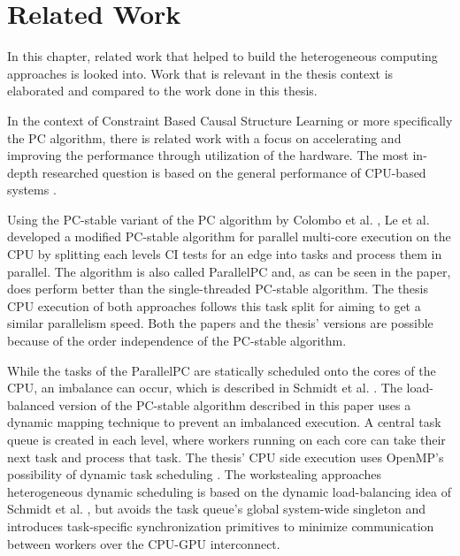 \chapter{Related Work}
\label{chap:relwork}
In this chapter, related work that helped to build the heterogeneous computing approaches is looked into. Work that is relevant in the thesis context is elaborated and compared to the work done in this thesis.

In the context of Constraint Based Causal Structure Learning or more specifically the PC algorithm, there is related work with a focus on accelerating and improving the performance through utilization of the hardware. The most in-depth researched question is based on the general performance of CPU-based systems \cite{leFastPCAlgorithm2019, leParallelPCPackageEfficient2018, schmidtLoadBalancedParallelConstraintBased2019, colomboOrderIndependentConstraintBasedCausal,kalischEstimatingHighDimensionalDirected2007,scutariBayesianNetworkConstraintBased2017, madsenParallelAlgorithmBayesian2017,madsenParallelisationPCAlgorithm2015,nguyenMrPCCausalStructure2020}. 

Using the PC-stable variant of the PC algorithm by Colombo et al. \cite{colomboOrderIndependentConstraintBasedCausal}, Le et al. \cite{leFastPCAlgorithm2019, leParallelPCPackageEfficient2018} developed a modified PC-stable algorithm for parallel multi-core execution on the CPU by splitting each levels CI tests for an edge into tasks and process them in parallel. The algorithm is also called ParallelPC and, as can be seen in the paper, does perform better than the single-threaded PC-stable algorithm. The thesis CPU execution of both approaches follows this task split for aiming to get a similar parallelism speed. Both the papers and the thesis' versions are possible because of the order independence of the PC-stable algorithm.

While the tasks of the ParallelPC are statically scheduled onto the cores of the CPU, an imbalance can occur, which is described in Schmidt et al. \cite{schmidtLoadBalancedParallelConstraintBased2019}. The load-balanced version of the PC-stable algorithm described in this paper uses a dynamic mapping technique to prevent an imbalanced execution. A central task queue is created in each level, where workers running on each core can take their next task and process that task. The thesis' CPU side execution uses OpenMP's possibility of dynamic task scheduling \cite{breshearsArtConcurrencyThread2009}. The workstealing approaches heterogeneous dynamic scheduling is based on the dynamic load-balancing idea of Schmidt et al. \cite{schmidtLoadBalancedParallelConstraintBased2019}, but avoids the task queue's global system-wide singleton and introduces task-specific synchronization primitives to minimize communication between workers over the CPU-GPU interconnect.

